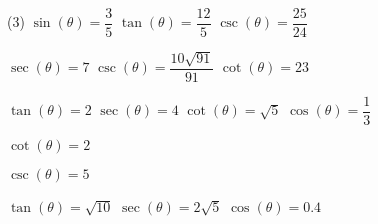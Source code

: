 \begin{tasks}[resume](3)
\task $\sin(\theta) = \dfrac{3}{5}$  \label{findothercircfirstapprighttrig}
\task $\tan(\theta) = \dfrac{12}{5}$
\task $\csc(\theta) = \dfrac{25}{24}$

\task $\sec(\theta) = 7$  
\task $\csc(\theta) = \dfrac{10\sqrt{91}}{91}$ 
\task $\cot(\theta) = 23$ 

\task  $\tan(\theta) = 2$  
\task  $\sec(\theta) = 4$  
\task $\cot(\theta) = \sqrt{5}$ 
\task  $\cos(\theta) = \dfrac{1}{3}$ 

\task  $\cot(\theta) = 2$ 

\task  $\csc(\theta) = 5$ 

\task  $\tan(\theta) = \sqrt{10}$ 
\task  $\sec(\theta) = 2\sqrt{5}$ 
\task  $\cos(\theta) = 0.4$    \label{findothercirclastapprighttrig}

\end{tasks}

